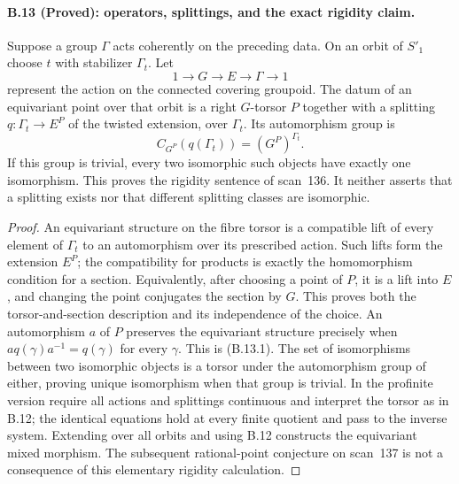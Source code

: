 \paragraph{B.13 (Proved): operators, splittings, and the exact rigidity claim.}\label{B13}
Suppose a group $\Gamma$ acts coherently on the preceding
data. On an orbit of $S'_1$ choose $t$ with stabilizer
$\Gamma_t$. Let
\[
 1\longrightarrow G\longrightarrow E\longrightarrow\Gamma
       \longrightarrow1
\]
represent the action on the connected covering groupoid.
The datum of an equivariant point over that orbit is a
right $G$-torsor $P$ together with a splitting
$q:\Gamma_t\to E^P$ of the twisted extension, over
$\Gamma_t$. Its automorphism group is
\[
 C_{G^P}(q(\Gamma_t))=(G^P)^{\Gamma_t}.                    \tag{B.13.1}
\]
If this group is trivial, every two isomorphic such
objects have exactly one isomorphism. This proves the
rigidity sentence of scan~136. It neither asserts that
a splitting exists nor that different splitting classes
are isomorphic.

\begin{proof}
An equivariant structure on the fibre torsor is a
compatible lift of every element of $\Gamma_t$ to an
automorphism over its prescribed action. Such lifts
form the extension $E^P$; the compatibility for
products is exactly the homomorphism condition for
a section. Equivalently, after choosing a point of
$P$, it is a lift into $E$, and changing the point
conjugates the section by $G$. This proves both the
torsor-and-section description and its independence
of the choice. An automorphism $a$ of $P$ preserves
the equivariant structure precisely when
$a q(\gamma)a^{-1}=q(\gamma)$ for every $\gamma$.
This is (B.13.1). The set of isomorphisms between two
isomorphic objects is a torsor under the automorphism
group of either, proving unique isomorphism when that
group is trivial. In the profinite version require
all actions and splittings continuous and interpret
the torsor as in B.12; the identical equations hold
at every finite quotient and pass to the inverse
system. Extending over all orbits and using B.12
constructs the equivariant mixed morphism. The
subsequent rational-point conjecture on scan~137 is
not a consequence of this elementary rigidity
calculation.
\end{proof}
